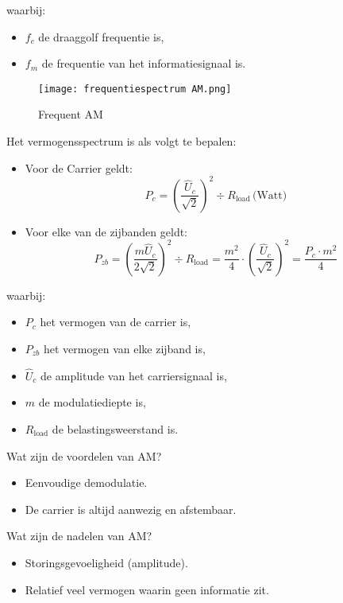 waarbij:
\begin{itemize}
  \item \(f_c\) de draaggolf frequentie is,
  \item \(f_m\) de frequentie van het informatiesignaal is.
\end{itemize}

\begin{figure}[H]
\centering
\texttt{[image: frequentiespectrum AM.png]}
\caption{Frequent AM}
\end{figure}

Het vermogensspectrum is als volgt te bepalen:

\begin{itemize}
  \item Voor de Carrier geldt:
  \[ P_c = \left(\frac{\hat{U}_c}{\sqrt{2}}\right)^2 \div R_{\text{load}} \, \text{(Watt)} \]

  \item Voor elke van de zijbanden geldt:
  \[ P_{zb} = \left(\frac{m\hat{U}_c}{2\sqrt{2}}\right)^2 \div R_{\text{load}} = \frac{m^2}{4} \cdot \left(\frac{\hat{U}_c}{\sqrt{2}}\right)^2 = \frac{P_c \cdot m^2}{4} \]
\end{itemize}

waarbij:
\begin{itemize}
  \item \(P_c\) het vermogen van de carrier is,
  \item \(P_{zb}\) het vermogen van elke zijband is,
  \item \(\hat{U}_c\) de amplitude van het carriersignaal is,
  \item \(m\) de modulatiediepte is,
  \item \(R_{\text{load}}\) de belastingsweerstand is.
\end{itemize}

\vspace{0.5cm}
Wat zijn de voordelen van AM?
\begin{itemize}
  \item Eenvoudige demodulatie.
  \item De carrier is altijd aanwezig en afstembaar.
\end{itemize}

Wat zijn de nadelen van AM?
\begin{itemize}
  \item Storingsgevoeligheid (amplitude).
  \item Relatief veel vermogen waarin geen informatie zit.
\end{itemize}

